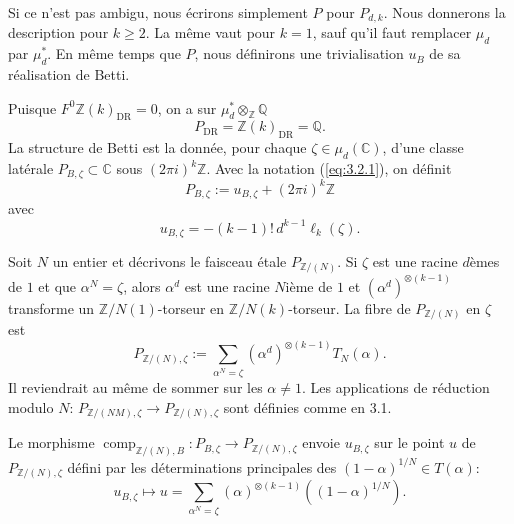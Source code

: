 \documentclass[12pt,a4paper]{article}
\theoremstyle{plain}
\theoremstyle{definition}
\theoremstyle{remark}
\providecommand{\DR}{\mathrm{DR}}
\providecommand{\comp}{\operatorname{comp}}
\begin{document}
Si ce n'est pas ambigu, nous \'ecrirons simplement $P$ pour $P_{d,k}$. Nous donnerons la
description pour $k \geq 2$. La m\^eme vaut pour $k = 1$, sauf qu'il faut remplacer
$\mu_d$ par $\mu_d^*$. En m\^eme temps que $P$, nous d\'efinirons une trivialisation
$u_B$ de sa r\'ealisation de Betti.

Puisque $F^0 \mathbb{Z}(k)_{\DR} = 0$, on a sur $\mu_d^* \otimes_{\mathbb{Z}} \mathbb{Q}$
\[
P_{\DR} = \mathbb{Z}(k)_{\DR} = \mathbb{Q}.
\]
La structure de Betti est la donn\'ee, pour chaque $\zeta \in \mu_d(\mathbb{C})$, d'une
classe lat\'erale $P_{B,\zeta} \subset \mathbb{C}$ sous $(2\pi i)^k \mathbb{Z}$. Avec la
notation (\ref{eq:3.2.1}), on d\'efinit
\begin{equation}\label{eq:3.11.1}
P_{B,\zeta} := u_{B,\zeta} + (2\pi i)^k \mathbb{Z}
\end{equation}
avec
\begin{equation*}
u_{B,\zeta} = -(k-1)!\, d^{k-1} \ell_k(\zeta).
\end{equation*}

Soit $N$ un entier et d\'ecrivons le faisceau \'etale $P_{\mathbb{Z}/(N)}$. Si $\zeta$
est une racine $d$\`emes de $1$ et que $\alpha^N = \zeta$, alors $\alpha^d$ est une
racine $N$i\`eme de $1$ et $(\alpha^d)^{\otimes(k-1)}$ transforme un
$\mathbb{Z}/N(1)$-torseur en $\mathbb{Z}/N(k)$-torseur. La fibre de
$P_{\mathbb{Z}/(N)}$ en $\zeta$ est
\begin{equation}\label{eq:3.11.2}
P_{\mathbb{Z}/(N),\zeta} := \sum_{\alpha^N=\zeta} (\alpha^d)^{\otimes(k-1)} T_N(\alpha).
\end{equation}
Il reviendrait au m\^eme de sommer sur les $\alpha \neq 1$. Les applications de
r\'eduction modulo $N$: $P_{\mathbb{Z}/(NM),\zeta} \to P_{\mathbb{Z}/(N),\zeta}$ sont
d\'efinies comme en 3.1.

Le morphisme $\comp_{\mathbb{Z}/(N),B}: P_{B,\zeta} \to P_{\mathbb{Z}/(N),\zeta}$ envoie
$u_{B,\zeta}$ sur le point $u$ de $P_{\mathbb{Z}/(N),\zeta}$ d\'efini par les
d\'eterminations principales des $(1-\alpha)^{1/N} \in T(\alpha)$:
\begin{equation}\label{eq:3.11.3}
u_{B,\zeta} \longmapsto u = \sum_{\alpha^N=\zeta} (\alpha)^{\otimes(k-1)}((1-\alpha)^{1/N}).
\end{equation}
\end{document}

